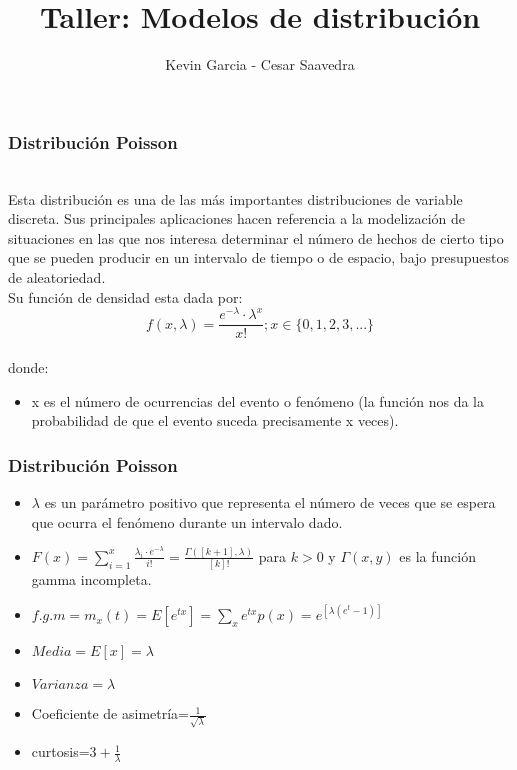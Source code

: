 \documentclass[11pt]{beamer}
\author{Kevin Garcia - Cesar Saavedra}
\title{Taller: Modelos de distribución}
\begin{document}
\begin{frame}
\titlepage
\end{frame}


\begin{frame}
\frametitle{Distribuci\'{o}n Poisson}
~\\  Esta distribuci\'{o}n es una de las más importantes distribuciones de variable discreta. Sus principales aplicaciones hacen referencia a la modelizaci\'{o}n de situaciones en las que nos interesa determinar el n\'{u}mero de hechos de cierto tipo que se pueden producir en un intervalo de tiempo o de espacio, bajo presupuestos de aleatoriedad.
~\\ Su funci\'{o}n de densidad esta dada por: 
~\\$$f(x,\lambda)=\frac{e^{-\lambda}\cdot \lambda^x}{x!}  ; x \in \{0,1,2,3,...\}$$
~\\donde:
\begin{itemize} 
\item x es el número de ocurrencias del evento o fen\'{o}meno (la funci\'{o}n nos da la probabilidad de que el evento suceda precisamente x veces).
\end{itemize}
\end{frame}

\begin{frame}
\frametitle{Distribución Poisson}
\begin{itemize}
\item $\lambda$ es un parámetro positivo que representa el número de veces que se espera que ocurra el fenómeno durante un intervalo dado.
\item $F(x)=\sum\limits_{i=1}^{x} \frac{\lambda_{i}\cdot e^{-\lambda}}{i!}=\frac{\Gamma([k+1],\lambda)}{[k]!}$ para $k>0$ y $\Gamma(x,y)$ es la función gamma incompleta.
\item $f.g.m=m_{x}(t)=E[e^{tx}]=\sum\limits_{x} e^{tx}p(x)= e^{[\lambda(e^t-1)]}$
\item $Media=E[x]=\lambda$
\item $Varianza=\lambda$
\item Coeficiente de asimetría=$\frac{1}{\sqrt{\lambda}}$
\item curtosis=$3+\frac{1}{\lambda}$
\end{itemize}
\end{frame}
\end{document}
